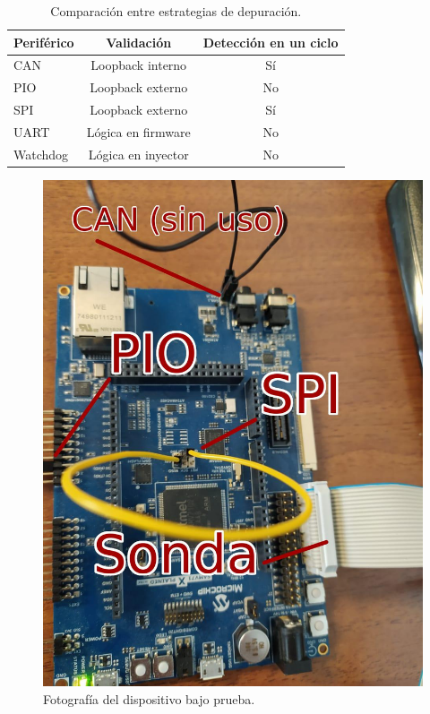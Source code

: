 \begin{table}[h]
	\centering
	\caption[Estrategias de depuración]{Comparación entre estrategias de depuración.}

	\begin{tabular}{l c c}    
		\toprule
        \textbf{Periférico} & \textbf{Validación}       & \textbf{Detección en un ciclo}\\
		\midrule
		CAN                 & Loopback interno          & Sí\\		
		PIO                 & Loopback externo          & No\\
		SPI                 & Loopback externo          & Sí\\
		UART                & Lógica en firmware        & No\\
		Watchdog            & Lógica en inyector        & No\\
		\bottomrule
		\hline
	\end{tabular}
	\label{tab:perifericos}
\end{table}

\begin{figure}[htbp]
	\centering
	\includegraphics[width=\textwidth]{./Figures/labo.jpeg}
    \caption{Fotografía del dispositivo bajo prueba.}
	\label{fig:labo}
\end{figure}


